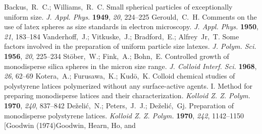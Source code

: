 \documentclass[journal=langd5,manuscript=article]{achemso}
\begin{document}
\begin{mcitethebibliography}{47}
Backus,~R.~C.; Williams,~R.~C. Small spherical particles of exceptionally
  uniform size. \emph{J. Appl. Phys.} \textbf{1949}, \emph{20}, 224--225\relax
\mciteBstWouldAddEndPuncttrue
\mciteSetBstMidEndSepPunct{\mcitedefaultmidpunct}
{\mcitedefaultendpunct}{\mcitedefaultseppunct}\relax
\EndOfBibitem
{}
Gerould,~C.~H. Comments on the use of latex spheres as size standards in
  electron microscopy. \emph{J. Appl. Phys.} \textbf{1950}, \emph{21},
  183--184\relax
\mciteBstWouldAddEndPuncttrue
\mciteSetBstMidEndSepPunct{\mcitedefaultmidpunct}
{\mcitedefaultendpunct}{\mcitedefaultseppunct}\relax
\EndOfBibitem
{}
Vanderhoff,~J.; Vitkuske,~J.; Bradford,~E.; Alfrey~Jr,~T. Some factors involved
  in the preparation of uniform particle size latexes. \emph{J. Polym. Sci.}
  \textbf{1956}, \emph{20}, 225--234\relax
\mciteBstWouldAddEndPuncttrue
\mciteSetBstMidEndSepPunct{\mcitedefaultmidpunct}
{\mcitedefaultendpunct}{\mcitedefaultseppunct}\relax
\EndOfBibitem
{}
St{\"o}ber,~W.; Fink,~A.; Bohn,~E. Controlled growth of monodisperse silica
  spheres in the micron size range. \emph{J. Colloid Interf. Sci.}
  \textbf{1968}, \emph{26}, 62--69\relax
\mciteBstWouldAddEndPuncttrue
\mciteSetBstMidEndSepPunct{\mcitedefaultmidpunct}
{\mcitedefaultendpunct}{\mcitedefaultseppunct}\relax
\EndOfBibitem
{}
Kotera,~A.; Furusawa,~K.; Kud{\=o},~K. Colloid chemical studies of polystyrene
  latices polymerized without any surface-active agents. {I.} Method for
  preparing monodisperse latices and their characterization. \emph{Kolloid Z.
  Z. Polym.} \textbf{1970}, \emph{240}, 837--842\relax
\mciteBstWouldAddEndPuncttrue
\mciteSetBstMidEndSepPunct{\mcitedefaultmidpunct}
{\mcitedefaultendpunct}{\mcitedefaultseppunct}\relax
\EndOfBibitem
{}
De\v{z}eli\'{c},~N.; Peters,~J.~J.; De\v{z}eli\'{c},~{\relax Gj}. Preparation
  of monodisperse polystyrene latices. \emph{Kolloid Z. Z. Polym.}
  \textbf{1970}, \emph{242}, 1142--1150\relax
\mciteBstWouldAddEndPuncttrue
\mciteSetBstMidEndSepPunct{\mcitedefaultmidpunct}
{\mcitedefaultendpunct}{\mcitedefaultseppunct}\relax
\EndOfBibitem
\bibitem[Goodwin (1974)Goodwin, Hearn, Ho, and

\end{mcitethebibliography}
\end{document}
